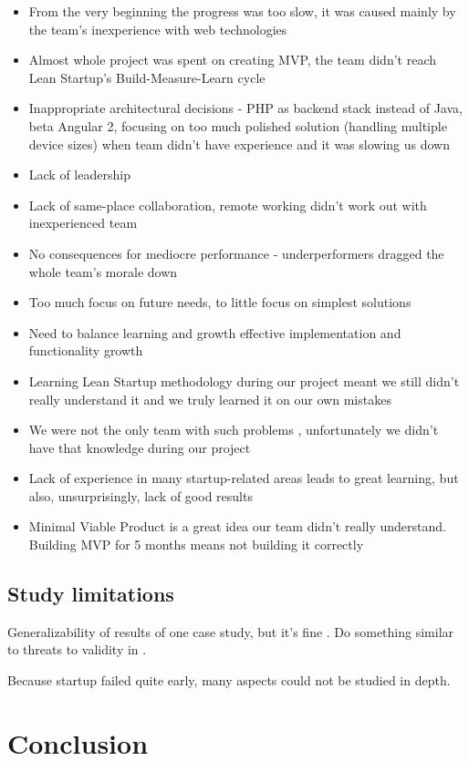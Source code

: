 \documentclass{article}
\begin{document}
\begin{itemize}
  \item From the very beginning the progress was too slow, it was caused mainly by the team's inexperience with web technologies 
  \item Almost whole project was spent on creating MVP, the team didn't reach Lean Startup's Build-Measure-Learn cycle
  \item Inappropriate architectural decisions - PHP as backend stack instead of Java, beta Angular 2, focusing on too much polished solution (handling multiple device sizes) when team didn't have experience and it was slowing us down
  \item Lack of leadership
  \item Lack of same-place collaboration, remote working didn't work out with inexperienced team
  \item No consequences for mediocre performance - underperformers dragged the whole team's morale down
  \item Too much focus on future needs, to little focus on simplest solutions
  \item Need to balance learning and growth effective implementation and functionality growth
  \item Learning Lean Startup methodology during our project meant we still didn't really understand it and we truly learned it on our own mistakes
  \item We were not the only team with such problems \cite{may2012applying}, unfortunately we didn't have that knowledge during our project
  \item Lack of experience in many startup-related areas leads to great learning, but also, unsurprisingly, lack of good results
  \item Minimal Viable Product is a great idea our team didn't really understand. Building MVP for 5 months means not building it correctly
\end{itemize}

\subsection{Study limitations}
Generalizability of results of one case study, but it's fine \cite{flyvbjerg2006five}.
Do something similar to threats to validity in \cite{sfetsos2016integrating}.

Because startup failed quite early, many aspects could not be studied in depth.
\section{Conclusion}
\end{document}
